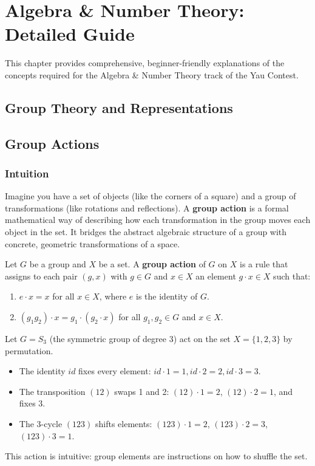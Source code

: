 \chapter{Algebra \& Number Theory: Detailed Guide}

This chapter provides comprehensive, beginner-friendly explanations of the concepts required for the Algebra \& Number Theory track of the Yau Contest.

\section{Group Theory and Representations}

\section{Group Actions}

\subsection{Intuition}
Imagine you have a set of objects (like the corners of a square) and a group of transformations (like rotations and reflections). A \textbf{group action} is a formal mathematical way of describing how each transformation in the group moves each object in the set. It bridges the abstract algebraic structure of a group with concrete, geometric transformations of a space.

\begin{definition}
Let $G$ be a group and $X$ be a set. A \textbf{group action} of $G$ on $X$ is a rule that assigns to each pair $(g, x)$ with $g \in G$ and $x \in X$ an element $g \cdot x \in X$ such that:
\begin{enumerate}
    \item $e \cdot x = x$ for all $x \in X$, where $e$ is the identity of $G$.
    \item $(g_1 g_2) \cdot x = g_1 \cdot (g_2 \cdot x)$ for all $g_1, g_2 \in G$ and $x \in X$.
\end{enumerate}
\end{definition}

\begin{example}
Let $G = S_3$ (the symmetric group of degree 3) act on the set $X = \{1, 2, 3\}$ by permutation. 
\begin{itemize}
    \item The identity $id$ fixes every element: $id \cdot 1 = 1, id \cdot 2 = 2, id \cdot 3 = 3$.
    \item The transposition $(12)$ swaps 1 and 2: $(12) \cdot 1 = 2$, $(12) \cdot 2 = 1$, and fixes 3.
    \item The 3-cycle $(123)$ shifts elements: $(123) \cdot 1 = 2$, $(123) \cdot 2 = 3$, $(123) \cdot 3 = 1$.
\end{itemize}
This action is intuitive: group elements are instructions on how to shuffle the set.
\end{example}

